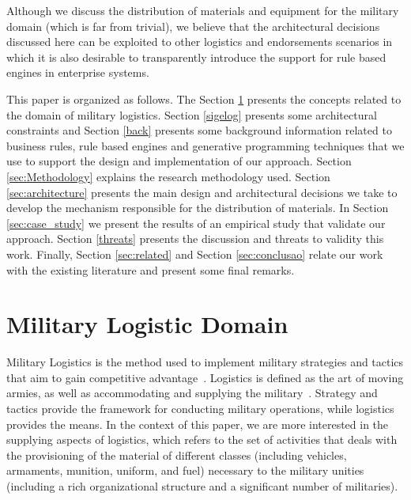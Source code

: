 \documentclass[AMA,STIX1COL,hidelinks]{WileyNJD-v2}
\begin{document}
Although we discuss the distribution of materials and equipment for the military domain (which is far from trivial), we believe that the architectural decisions discussed here can be exploited to other logistics and endorsements scenarios in which it is also desirable to transparently introduce the support for rule based engines in enterprise systems.

This paper is organized as follows. The Section \ref{sec:logistics} presents the concepts related to the domain of military logistics. Section \ref{sigelog} presents some architectural constraints and Section \ref{back} presents some background information related to business rules, rule based engines and generative programming techniques that we use to support the design and implementation of our approach. Section \ref{sec:Methodology} explains the research methodology used. Section \ref{sec:architecture} presents the main design and architectural decisions we take to develop the mechanism responsible for the distribution of materials. In Section \ref{sec:case_study} we present the results of an empirical study that validate our approach. Section \ref{threats} presents the discussion and threats to validity this work. Finally, Section \ref{sec:related} and Section \ref{sec:conclusao} relate our work with the existing literature and present some final remarks.









\section{Military Logistic Domain}
\label{sec:logistics}

Military Logistics is the method used to implement military strategies and tactics that aim to gain competitive advantage~\cite{rutner2012}. Logistics is defined as the art of moving armies, as well as accommodating and supplying the military~\cite{prebilic2006}. Strategy and tactics provide the framework for conducting military operations, while logistics provides the means. In the context of this paper, we are more interested in the supplying aspects of logistics, which refers to the set of activities that deals with the  provisioning of the material of different classes (including vehicles, armaments, munition, uniform, and fuel) necessary to the military unities (including a rich organizational structure and a significant number of militaries). 
\end{document}
